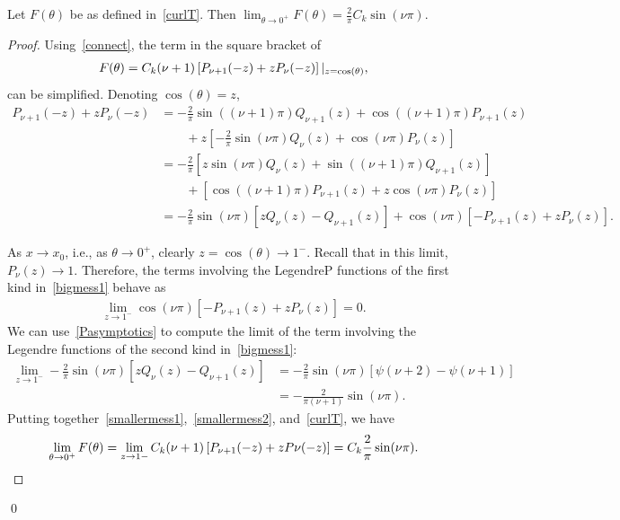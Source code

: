 \begin{lemma} 
Let $F(\theta)$ be as defined in~\eqref{curlT}. Then
$\lim_{\theta\rightarrow 0^+} F(\theta)= \frac{2}{\pi}C_k \sin(\nu
\pi)$.
\end{lemma}
\begin{proof} 
Using~\eqref{connect}, the term in the square bracket of
\begin{align*}
F(\theta) =  C_k (\nu+1)  \left[ P_{\nu+1}(-z) + 
  z P_\nu(-z)\right]\vert_{z=\cos(\theta)},
\end{align*}
can be simplified.  Denoting $\cos(\theta)=z$, 
\begin{align}
  P_{\nu+1}(-z) + z P_\nu(-z)&=-\frac{2}{\pi}\sin\left((\nu+1) \pi\right)Q_{\nu+1}(z)+
    \cos((\nu+1)\pi)P_{\nu+1}(z) \nonumber \\
  & \qquad +z\left[-\frac{2}{\pi}\sin(\nu\pi)Q_\nu\left(z\right)+
    \cos(\nu\pi)P_\nu\left(z\right)  \right] \nonumber \\
  &=-\frac{2}{\pi}\left[z\sin(\nu \pi)Q_\nu\left(z\right) + 
    \sin\left((\nu+1) \pi\right)Q_{\nu+1}\left(z\right)\right]
    \nonumber \\
  & \qquad +\left[ \cos((\nu+1)\pi)P_{\nu+1}\left(z\right) + 
    z\cos(\nu\pi)P_\nu\left(z\right) \right] \nonumber \\
  &=-\frac{2}{\pi}\sin(\nu \pi)\left[ 
    zQ_\nu\left(z\right) - Q_{\nu+1}\left(z\right)\right] 
  + \cos(\nu\pi)\left[
    -P_{\nu+1}\left(z\right)+zP_\nu\left(z\right)\right].
  \label{bigmess1}
\end{align}
 
As $x\rightarrow x_{0}$, i.e., as $\theta \rightarrow 0^{+}$, clearly
$z=\cos(\theta)\rightarrow 1^{-}$. Recall that in this limit, $P_\nu(z)
\rightarrow 1.$ Therefore, the terms involving the LegendreP functions
of the first kind in~\eqref{bigmess1} behave as 
\begin{align} 
  \label{smallermess1}
  \lim_{z \rightarrow 1^- }\cos(\nu\pi)\left[ -P_{\nu+1}(z)+ z P_\nu(z)
  \right]  = 0.
\end{align}
We can use~\eqref{Pasymptotics} to compute the limit of the term
involving the Legendre functions of the second kind in~\eqref{bigmess1}:
\begin{align}
  \lim_{z \rightarrow 1^{-}} 
    -\frac{2}{\pi}\sin(\nu\pi)\left[zQ_\nu\left(z\right) - 
    Q_{\nu+1}\left(z\right)\right] 
  &= -\frac{2}{\pi}\sin(\nu\pi)\left[
    \psi(\nu+2)-\psi(\nu+1) \right] \\
  &= -\frac{2}{\pi (\nu+1)}\sin(\nu \pi).
  \label{smallermess2}
\end{align}
Putting together~\eqref{smallermess1},~\eqref{smallermess2},
and~\eqref{curlT}, we have
\begin{align} 
  \label{doublelayerwithz}
\lim_{\theta \rightarrow 0^+}F(\theta) 
  = \lim_{z\rightarrow 1-}C_k(\nu+1)\left[ P_{\nu+1}(-z)+zP{\nu}(-z)\right]
  = C_k \frac{2}{\pi} \sin(\nu \pi).
\end{align}
\end{proof}
\qed

